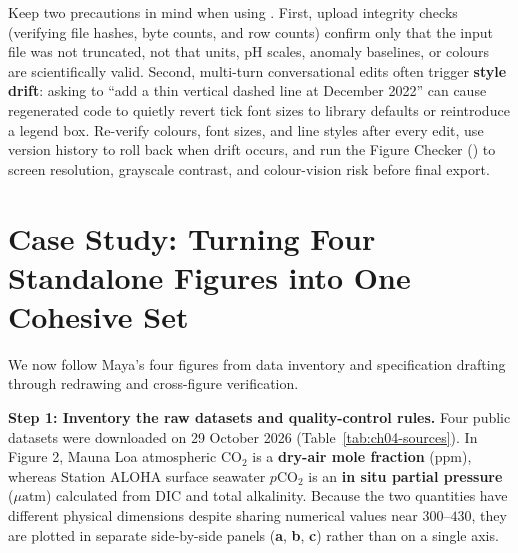 Keep two precautions in mind when using . First, upload integrity checks (verifying file hashes, byte counts, and row counts) confirm only that the input file was not truncated, not that units, pH scales, anomaly baselines, or colours are scientifically valid. Second, multi-turn conversational edits often trigger \textbf{style drift}: asking to ``add a thin vertical dashed line at December 2022'' can cause regenerated code to quietly revert tick font sizes to library defaults or reintroduce a legend box. Re-verify colours, font sizes, and line styles after every edit, use version history to roll back when drift occurs, and run the Figure Checker () to screen resolution, grayscale contrast, and colour-vision risk before final export.

\section{Case Study: Turning Four Standalone Figures into One Cohesive Set}

We now follow Maya's four figures from data inventory and specification drafting through redrawing and cross-figure verification.

\textbf{Step 1: Inventory the raw datasets and quality-control rules.} Four public datasets were downloaded on 29 October 2026 (Table~\ref{tab:ch04-sources}). In Figure 2, Mauna Loa atmospheric $\text{CO}_2$ is a \textbf{dry-air mole fraction} ($\text{ppm}$), whereas Station ALOHA surface seawater $p\text{CO}_2$ is an \textbf{in situ partial pressure} ($\mu\text{atm}$) calculated from DIC and total alkalinity. Because the two quantities have different physical dimensions despite sharing numerical values near $300\text{--}430$, they are plotted in separate side-by-side panels (\textbf{a}, \textbf{b}, \textbf{c}) rather than on a single axis.


